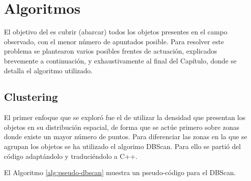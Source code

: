 %
%
%
%

\chapter{Algoritmos} \label{chap:algorithm}

El objetivo del \CSUO{} es cubrir (abarcar) todos los objetos 
presentes en el campo observado, con el menor
número de apuntados posible. Para resolver este problema se plantearon varios
posibles frentes de actuación, explicados brevemente a continuación, y
exhaustivamente al final del Capítulo, donde se detalla el algoritmo
utilizado.

\section{Clustering} \label{sec:clustering}

El primer enfoque que se exploró fue el de utilizar la densidad que presentan los
objetos en su distribución espacial, de forma que se actúe primero sobre zonas donde existe un
mayor número de puntos. Para diferenciar las zonas en la que se agrupan los
objetos se ha utilizado el algorimo DBScan.
Para ello se partió del código \cite{Web:GITDBS} adaptándolo y traduciéndolo a C++.

El Algoritmo \ref{alg:pseudo-dbscan} muestra un pseudo-código para el DBScan.

